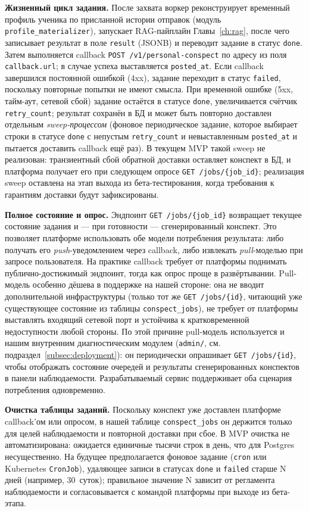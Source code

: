 \documentclass[a4paper,12pt]{extarticle}
\begin{document}
\textbf{Жизненный цикл задания.} После захвата воркер реконструирует временный
профиль ученика по присланной истории отправок (модуль \texttt{profile\_materializer}),
запускает RAG-пайплайн Главы~\ref{ch:rag}, после чего записывает результат в поле
\texttt{result} (JSONB) и переводит задание в статус \texttt{done}. Затем выполняется
callback \texttt{POST /v1/personal-conspect} по адресу из поля
\texttt{callback.url}; в случае успеха выставляется \texttt{posted\_at}. Если
callback завершился постоянной ошибкой (4xx), задание переходит в статус
\texttt{failed}, поскольку повторные попытки не имеют смысла. При временной ошибке
(5xx, тайм-аут, сетевой сбой) задание остаётся в статусе \texttt{done}, увеличивается
счётчик \texttt{retry\_count}; результат сохранён в БД и может быть повторно
доставлен отдельным \textit{sweep-процессом} (фоновое периодическое задание,
которое выбирает строки в статусе \texttt{done} с непустым \texttt{retry\_count}
и невыставленным \texttt{posted\_at} и пытается доставить callback ещё раз).
В текущем MVP такой sweep не реализован: транзиентный сбой обратной доставки
оставляет конспект в БД, и платформа получает его при следующем опросе
\texttt{GET /jobs/\{job\_id\}}; реализация sweep оставлена на этап выхода
из бета-тестирования, когда требования к гарантиям доставки будут зафиксированы.

\textbf{Полное состояние и опрос.} Эндпоинт \texttt{GET /jobs/\{job\_id\}} возвращает
текущее состояние задания и --- при готовности --- сгенерированный конспект.
Это позволяет платформе использовать обе модели потребления результата: либо
получать его \textit{push}-уведомлением через callback, либо извлекать
\textit{pull}-моделью при запросе пользователя. На практике callback
требует от платформы поднимать публично-достижимый эндпоинт, тогда как опрос
проще в развёртывании. Pull-модель особенно дёшева в поддержке на нашей стороне:
она не вводит дополнительной инфраструктуры (только тот же \texttt{GET /jobs/\{id\}},
читающий уже существующее состояние из таблицы \texttt{conspect\_jobs}), не
требует от платформы выставлять входящий сетевой порт и устойчива к
кратковременной недоступности любой стороны. По этой причине pull-модель
используется и нашим внутренним диагностическим модулем (\texttt{admin/}, см.
подраздел~\ref{subsec:deployment}): он периодически опрашивает
\texttt{GET /jobs/\{id\}}, чтобы отображать состояние очередей и результаты
сгенерированных конспектов в панели наблюдаемости. Разрабатываемый сервис
поддерживает оба сценария потребления одновременно.

\textbf{Очистка таблицы заданий.} Поскольку конспект уже доставлен платформе
callback'ом или опросом, в нашей таблице \texttt{conspect\_jobs} он держится
только для целей наблюдаемости и повторной доставки при сбое. В MVP очистка не
автоматизирована: ожидается единичные тысячи строк в день, что для Postgres
несущественно. На будущее предполагается фоновое задание (\texttt{cron} или
Kubernetes \texttt{CronJob}), удаляющее записи в статусах \texttt{done} и
\texttt{failed} старше N дней (например, 30~суток); правильное значение N
зависит от регламента наблюдаемости и согласовывается с командой платформы при
выходе из бета-этапа.
\end{document}
